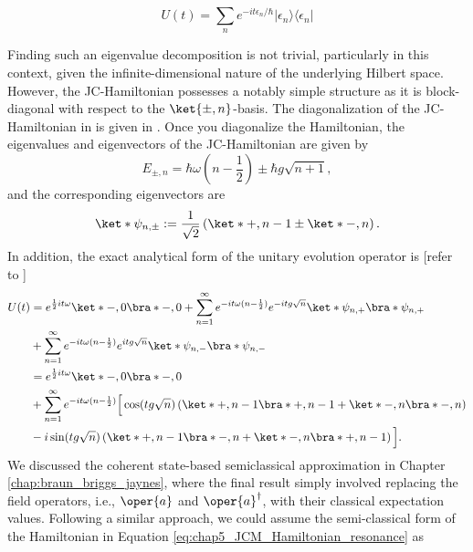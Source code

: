 \begin{equation}
U(t) = \sum_n e^{-i t \epsilon_n/\hbar} \lvert \epsilon_n \rangle \langle \epsilon_n \rvert
\end{equation}

Finding such an eigenvalue decomposition is not trivial, particularly in this context, 
given the infinite-dimensional nature of the underlying Hilbert space. However, the 
JC-Hamiltonian possesses a notably simple structure as it is block-diagonal with respect 
to the $\ket{\pm, n}$-basis. The diagonalization of the JC-Hamiltonian in 
 is given in  .
Once you diagonalize the Hamiltonian, the eigenvalues and eigenvectors of the JC-Hamiltonian are given by
\begin{equation}
        \label{eq:chap5_JCM_eigenvalues}
        E_{\pm, n} = \hbar \omega \left(n - \frac{1}{2}\right) \pm \hbar g \sqrt{n + 1},
\end{equation}
and the corresponding eigenvectors are
\begin{equation}
        \label{eq:chap5_JCM_eigenvectors}
        \ket*{\psi_{n,\pm}} := \frac{1}{\sqrt{2}} 
     \left( \ket*{+, n - 1} \pm \ket*{-, n} \right).
\end{equation}
In addition, the exact analytical form of the unitary evolution operator is [refer to ]
\begin{align}
    U(t)  
    &= e^{\frac{1}{2} i t \omega } \ket*{-, 0}\bra*{-, 0} + \sum_{n=1}^{\infty} e^{-i t \omega (n - \frac{1}{2})} e^{-i t g \sqrt{n}} \ket*{\psi_{n,+}}\bra*{\psi_{n,+}} \nonumber \\
     &+ \sum_{n=1}^{\infty} e^{-i t \omega (n - \frac{1}{2})} e^{i t g \sqrt{n}} \ket*{\psi_{n,-}}\bra*{\psi_{n,-}} \nonumber \\
    &= e^{\frac{1}{2} i t \omega }\ket*{-, 0}\bra*{-, 0} \nonumber \\
     &+ \sum_{n=1}^{\infty} e^{-i t \omega (n - \frac{1}{2})} \Big[ \cos(t g \sqrt{n}) \left( \ket*{+, n - 1}\bra*{+, n - 1} + \ket*{-, n}\bra*{-, n} \right) \nonumber \\
     &- i \sin(t g \sqrt{n}) \left( \ket*{+, n - 1}\bra*{-, n} + \ket*{-, n}\bra*{+, n - 1} \right) \Big].
\end{align}
We discussed the coherent state-based semiclassical approximation in Chapter
\ref{chap:braun_briggs_jaynes}, where the final result simply involved replacing
the field operators, i.e., \( \oper{a} \) and \( \oper{a}^\dagger \), with their
classical expectation values. Following a similar approach, we could assume the semi-classical form
of the Hamiltonian in Equation \ref{eq:chap5_JCM_Hamiltonian_resonance} as

